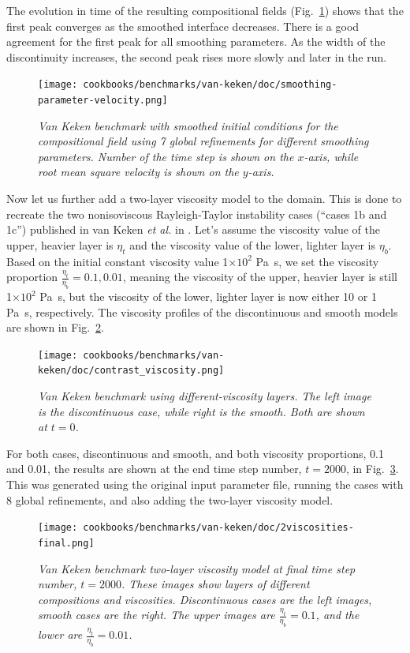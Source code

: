 \documentclass{article}
\begin{document}
The evolution in time of the resulting compositional fields (Fig.~\ref{fig:vk-6}) shows that the first peak converges as the smoothed interface decreases. There is a good agreement for the first peak for all smoothing parameters.  As the width of the discontinuity increases, the second peak rises more slowly and later in the run.

\begin{figure}
        \centering
        \texttt{[image: cookbooks/benchmarks/van-keken/doc/smoothing-parameter-velocity.png]}
        \caption{\it Van Keken benchmark with smoothed initial conditions for the compositional field using 7 global refinements for different smoothing parameters.  Number of the time step is shown on the $x$-axis, while root mean square velocity is shown on the $y$-axis.}
        \label{fig:vk-6}
\end{figure}

Now let us further add a two-layer viscosity model to the domain. This is done to recreate the two nonisoviscous Rayleigh-Taylor instability cases (``cases 1b and 1c'') published in van Keken \textit{et al.} in \cite{KKSCND97}.  Let's assume the viscosity value of the upper, heavier layer is $\eta_{t}$ and the viscosity value of the lower, lighter layer is $\eta_{b}$. Based on the initial constant viscosity value 1$\times10^{2}$ \si{Pa.s}, we set the viscosity proportion $\frac{\eta_{t}}{\eta_{b}}=0.1, 0.01$, meaning the viscosity of the upper, heavier layer is still 1$\times10^{2}$ \si{Pa.s}, but the viscosity of the lower, lighter layer is now either 10 or 1 \si{Pa.s}, respectively. The viscosity profiles of the discontinuous and smooth models are shown in Fig.~\ref{fig:vk-7}.

\begin{figure}
        \centering
        \texttt{[image: cookbooks/benchmarks/van-keken/doc/contrast\_viscosity.png]}
        \caption{\it Van Keken benchmark using different-viscosity layers. The left image is the discontinuous case, while right is the smooth.  Both are shown at $t=0$.}
        \label{fig:vk-7}
\end{figure}

For both cases, discontinuous and smooth, and both viscosity proportions, 0.1 and 0.01, the results are shown at the end time step number, $t=2000$, in Fig.~\ref{fig:vk-8}.  This was generated using the original input parameter file, running the cases with 8 global refinements, and also adding the two-layer viscosity model.

\begin{figure}
        \centering
        \texttt{[image: cookbooks/benchmarks/van-keken/doc/2viscosities-final.png]}
        \caption{\it Van Keken benchmark two-layer viscosity model at final time step number, $t=2000$. These images show layers of different compositions and viscosities. Discontinuous cases are the left images, smooth cases are the right. The upper images are $\frac{\eta_{t}}{\eta_{b}}=0.1$, and the lower are $\frac{\eta_{t}}{\eta_{b}}=0.01$.}
        \label{fig:vk-8}
\end{figure}
\end{document}
